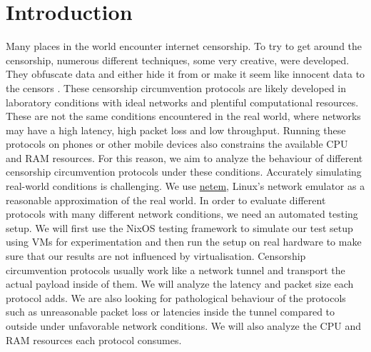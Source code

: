 
\chapter{Introduction}


Many places in the world encounter internet censorship. To try to get around the censorship, numerous different techniques, some very creative, were developed. They obfuscate data and either hide it from or make it seem like innocent data to the censors . These censorship circumvention protocols are likely developed in laboratory conditions with ideal networks and plentiful computational resources. These are not the same conditions encountered in the real world, where networks may have a high latency, high packet loss and low throughput. Running these protocols on phones or other mobile devices also constrains the available CPU and RAM resources. For this reason, we aim to analyze the behaviour of different censorship circumvention protocols under these conditions. Accurately simulating real-world conditions is challenging. We use \href{https://man7.org/linux/man-pages/man8/tc-netem.8.html}{netem}, Linux's network emulator as a reasonable approximation of the real world. In order to evaluate different protocols with many different network conditions, we need an automated testing setup. We will first use the NixOS testing framework to simulate our test setup using VMs for experimentation and then run the setup on real hardware to make sure that our results are not influenced by virtualisation. Censorship circumvention protocols usually work like a network tunnel and transport the actual payload inside of them. We will analyze the latency and packet size each protocol adds. We are also looking for pathological behaviour of the protocols such as unreasonable packet loss or latencies inside the tunnel compared to outside under unfavorable network conditions. We will also analyze the CPU and RAM resources each protocol consumes.
